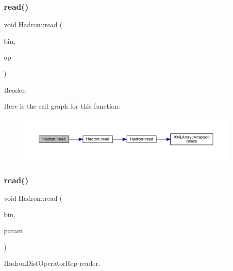 \subsubsection{\texorpdfstring{read()}{read()}\hspace{0.1cm}{\footnotesize\ttfamily [89/94]}}
{\footnotesize\ttfamily void Hadron\+::read (\begin{DoxyParamCaption}\item[{\mbox{\hyperlink{classADATIO_1_1BinaryReader}{Binary\+Reader}} \&}]{bin,  }\item[{\mbox{\hyperlink{structHadron_1_1KeySingleHadronQuarkDeriv__t}{Key\+Single\+Hadron\+Quark\+Deriv\+\_\+t}} \&}]{op }\end{DoxyParamCaption})}



Reader. 

Here is the call graph for this function\+:\nopagebreak
\begin{figure}[H]
\begin{center}
\leavevmode
\includegraphics[width=350pt]{d1/daf/namespaceHadron_a14726c9fa76350682d7ef85457af512b_cgraph}
\end{center}
\end{figure}
\mbox{\label{namespaceHadron_adeba574c3428db28a2e7054d5f4d32d6}} 
\subsubsection{\texorpdfstring{read()}{read()}\hspace{0.1cm}{\footnotesize\ttfamily [90/94]}}
{\footnotesize\ttfamily void Hadron\+::read (\begin{DoxyParamCaption}\item[{\mbox{\hyperlink{classADATIO_1_1BinaryReader}{Binary\+Reader}} \&}]{bin,  }\item[{\mbox{\hyperlink{classHadron_1_1HadronDistOperatorRep__t}{Hadron\+Dist\+Operator\+Rep\+\_\+t}} \&}]{param }\end{DoxyParamCaption})}



Hadron\+Dist\+Operator\+Rep reader. 

